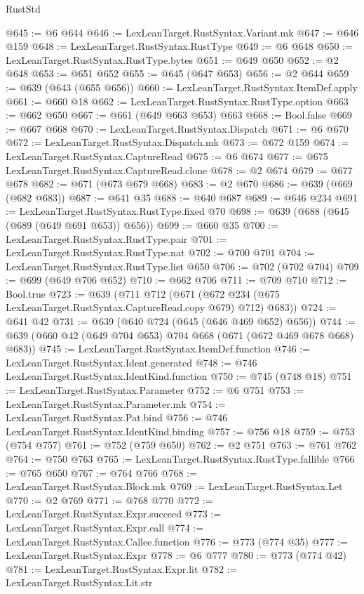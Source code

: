 \begin{lexlean}{RustStd}
\begin{coremodule}
@645 := @6 @644
@646 := LexLeanTarget.RustSyntax.Variant.mk
@647 := @646 @159
@648 := LexLeanTarget.RustSyntax.RustType
@649 := @6 @648
@650 := LexLeanTarget.RustSyntax.RustType.bytes
@651 := @649 @650
@652 := @2 @648
@653 := @651 @652
@655 := @645 (@647 @653)
@656 := @2 @644
@659 := @639 (@643 (@655 @656))
@660 := LexLeanTarget.RustSyntax.ItemDef.apply
@661 := @660 @18
@662 := LexLeanTarget.RustSyntax.RustType.option
@663 := @662 @650
@667 := @661 (@649 @663 @653) @663
@668 := Bool.false
@669 := @667 @668
@670 := LexLeanTarget.RustSyntax.Dispatch
@671 := @6 @670
@672 := LexLeanTarget.RustSyntax.Dispatch.mk
@673 := @672 @159
@674 := LexLeanTarget.RustSyntax.CaptureRead
@675 := @6 @674
@677 := @675 LexLeanTarget.RustSyntax.CaptureRead.clone
@678 := @2 @674
@679 := @677 @678
@682 := @671 (@673 @679 @668)
@683 := @2 @670
@686 := @639 (@669 (@682 @683))
@687 := @641 @35
@688 := @640 @687
@689 := @646 @234
@691 := LexLeanTarget.RustSyntax.RustType.fixed @70
@698 := @639 (@688 (@645 (@689 (@649 @691 @653)) @656))
@699 := @660 @35
@700 := LexLeanTarget.RustSyntax.RustType.pair
@701 := LexLeanTarget.RustSyntax.RustType.nat
@702 := @700 @701
@704 := LexLeanTarget.RustSyntax.RustType.list @650
@706 := @702 (@702 @704)
@709 := @699 (@649 @706 @652)
@710 := @662 @706
@711 := @709 @710
@712 := Bool.true
@723 := @639
    (@711 @712 (@671 (@672 @234 (@675 LexLeanTarget.RustSyntax.CaptureRead.copy @679) @712) @683))
@724 := @641 @42
@731 := @639 (@640 @724 (@645 (@646 @469 @652) @656))
@744 := @639 (@660 @42 (@649 @704 @653) @704 @668 (@671 (@672 @469 @678 @668) @683))
@745 := LexLeanTarget.RustSyntax.ItemDef.function
@746 := LexLeanTarget.RustSyntax.Ident.generated
@748 := @746 LexLeanTarget.RustSyntax.IdentKind.function
@750 := @745 (@748 @18)
@751 := LexLeanTarget.RustSyntax.Parameter
@752 := @6 @751
@753 := LexLeanTarget.RustSyntax.Parameter.mk
@754 := LexLeanTarget.RustSyntax.Pat.bind
@756 := @746 LexLeanTarget.RustSyntax.IdentKind.binding
@757 := @756 @18
@759 := @753 (@754 @757)
@761 := @752 (@759 @650)
@762 := @2 @751
@763 := @761 @762
@764 := @750 @763
@765 := LexLeanTarget.RustSyntax.RustType.fallible
@766 := @765 @650
@767 := @764 @766
@768 := LexLeanTarget.RustSyntax.Block.mk
@769 := LexLeanTarget.RustSyntax.Let
@770 := @2 @769
@771 := @768 @770
@772 := LexLeanTarget.RustSyntax.Expr.succeed
@773 := LexLeanTarget.RustSyntax.Expr.call
@774 := LexLeanTarget.RustSyntax.Callee.function
@776 := @773 (@774 @35)
@777 := LexLeanTarget.RustSyntax.Expr
@778 := @6 @777
@780 := @773 (@774 @42)
@781 := LexLeanTarget.RustSyntax.Expr.lit
@782 := LexLeanTarget.RustSyntax.Lit.str

\end{coremodule}
\end{lexlean}
